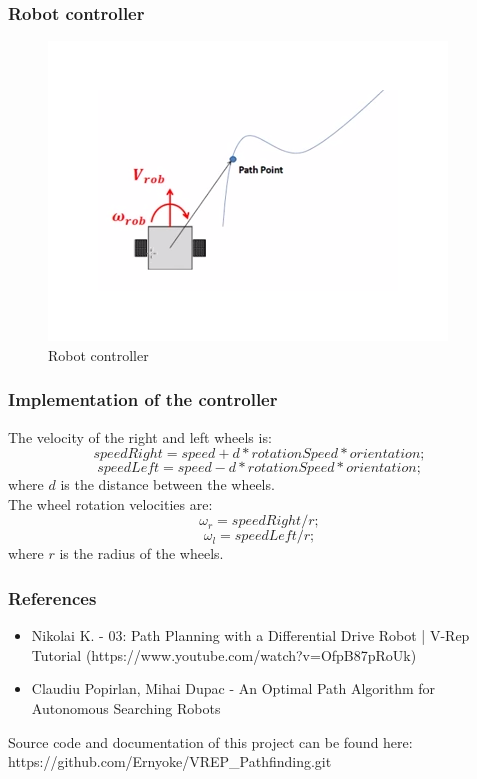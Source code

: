 \documentclass{beamer}
\begin{document}
	\begin{frame}
		\frametitle{Robot controller}
		\begin{figure}
			\includegraphics[scale=0.5]{controller}
			\caption{Robot controller}
		\end{figure}
	\end{frame}
	
	\begin{frame}
		\frametitle{Implementation of the controller}
		The velocity of the right and left wheels is:
		\begin{equation}
		speedRight = speed + d * rotationSpeed * orientation;
		\end{equation}
		\begin{equation}
		speedLeft = speed - d * rotationSpeed * orientation;
		\end{equation}
		where $d$ is the distance between the wheels. \\
		The wheel rotation velocities are:
		\begin{equation}
		\omega_r = speedRight / r;
		\end{equation}
		\begin{equation}
		\omega_l = speedLeft / r;
		\end{equation}
		where $r$ is the radius of the wheels.
	\end{frame}
	
	\begin{frame}
		\frametitle{References}
		\begin{itemize}
			\item Nikolai K. - 03: Path Planning with a Differential Drive Robot | V-Rep Tutorial (https://www.youtube.com/watch?v=OfpB87pRoUk)
			\item Claudiu Popirlan, Mihai Dupac - An Optimal Path Algorithm for Autonomous Searching
			Robots
		\end{itemize}
		\vspace{1cm}
		\centering
		Source code and documentation of this project can be found here: https://github.com/Ernyoke/VREP\_Pathfinding.git
	\end{frame}
\end{document}
